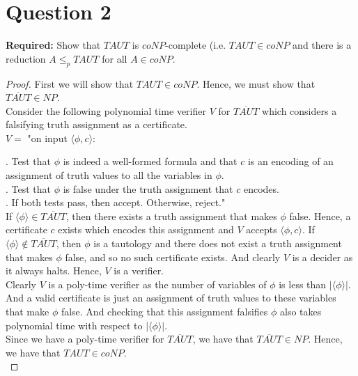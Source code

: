 \documentclass[12pt]{article}
\begin{document}
\newpage

\section*{Question 2}

\textbf{Required:} Show that $TAUT$ is $coNP$-complete (i.e. $TAUT \in coNP$ and there is a reduction $A \leq_p TAUT$ for all $A \in coNP$. 

\begin{proof}
First we will show that $TAUT \in coNP$. Hence, we must show that $\overline{TAUT} \in NP$. \\

Consider the following polynomial time verifier $V$ for $\overline{TAUT}$ which considers a falsifying truth assignment as a certificate. \\

$V = $ "on input $\langle \phi, c \rangle$: \\

\setlength\parindent{15pt}

. Test that $\phi$ is indeed a well-formed formula and that $c$ is an encoding of an assignment of truth values to all the variables in $\phi$. \\
. Test that $\phi$ is false under the truth assignment that $c$ encodes. \\
. If both tests pass, then accept. Otherwise, reject." \\

\setlength\parindent{0pt}
If $\langle \phi \rangle \in \overline{TAUT}$, then there exists a truth assignment that makes $\phi$ false. Hence, a certificate $c$ exists which encodes this assignment and $V$ accepts $\langle \phi, c \rangle$. If $\langle \phi \rangle \not \in \overline{TAUT}$, then $\phi$ is a tautology and there does not exist a truth assignment that makes $\phi$ false, and so no such certificate exists. And clearly $V$ is a decider as it always halts. Hence, $V$ is a verifier. \\

Clearly $V$ is a poly-time verifier as the number of variables of $\phi$ is less than $|\langle \phi \rangle|$. And a valid certificate is just an assignment of truth values to these variables that make $\phi$ false. And checking that this assignment falsifies $\phi$ also takes polynomial time with respect to $|\langle \phi \rangle|$. \\

Since we have a poly-time verifier for $\overline{TAUT}$, we have that $\overline{TAUT} \in NP$. Hence, we have that $TAUT \in coNP$. \\


\end{proof}
\end{document}
